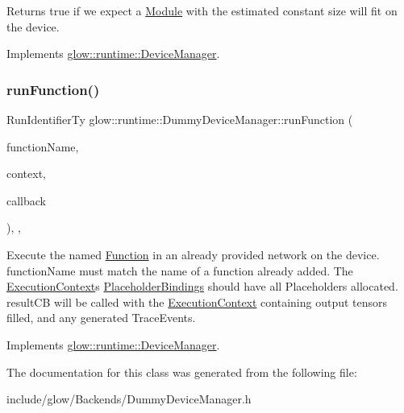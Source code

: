 \begin{DoxyReturn}{Returns}
true if we expect a \hyperlink{classglow_1_1_module}{Module} with the estimated constant size will fit on the device. 
\end{DoxyReturn}


Implements \hyperlink{classglow_1_1runtime_1_1_device_manager_ae9bba4abda9cb6aa1359a69e942feb22}{glow\+::runtime\+::\+Device\+Manager}.

\mbox{\label{classglow_1_1runtime_1_1_dummy_device_manager_a6a0da3ce939dea1323eead33a27d5487}} 
\subsubsection{\texorpdfstring{run\+Function()}{runFunction()}}
{\footnotesize\ttfamily Run\+Identifier\+Ty glow\+::runtime\+::\+Dummy\+Device\+Manager\+::run\+Function (\begin{DoxyParamCaption}\item[{std\+::string}]{function\+Name,  }\item[{std\+::unique\+\_\+ptr$<$ \hyperlink{classglow_1_1_execution_context}{Execution\+Context} $>$}]{context,  }\item[{Result\+C\+B\+Ty}]{callback }\end{DoxyParamCaption})\hspace{0.3cm}{\ttfamily [inline]}, {\ttfamily [override]}, {\ttfamily [virtual]}}

Execute the named \hyperlink{classglow_1_1_function}{Function} in an already provided network on the device. function\+Name must match the name of a function already added. The \hyperlink{classglow_1_1_execution_context}{Execution\+Context}\textquotesingle{}s \hyperlink{classglow_1_1_placeholder_bindings}{Placeholder\+Bindings} should have all Placeholders allocated. result\+CB will be called with the \hyperlink{classglow_1_1_execution_context}{Execution\+Context} containing output tensors filled, and any generated Trace\+Events. 

Implements \hyperlink{classglow_1_1runtime_1_1_device_manager_ac182cdf6ed9f6903c11fa71c0446d1f7}{glow\+::runtime\+::\+Device\+Manager}.



The documentation for this class was generated from the following file\+:\begin{DoxyCompactItemize}
\item 
include/glow/\+Backends/Dummy\+Device\+Manager.\+h\end{DoxyCompactItemize}
